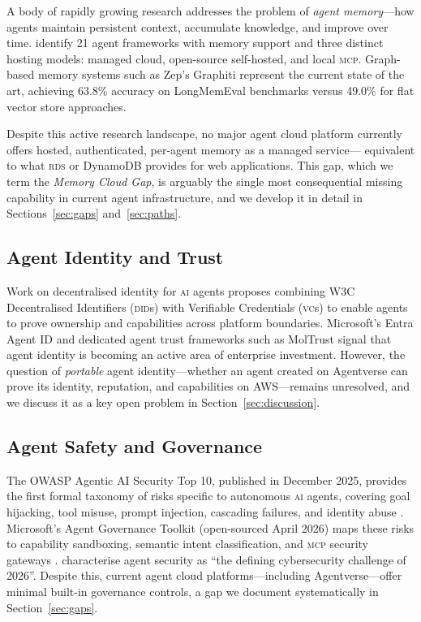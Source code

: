 \documentclass[twoside,11pt]{article}
\begin{document}
A body of rapidly growing research addresses the problem of \emph{agent
memory}---how agents maintain persistent context, accumulate knowledge, and
improve over time.  \citet{mem0blog2026} identify 21 agent frameworks with
memory support and three distinct hosting models: managed cloud, open-source
self-hosted, and local \textsc{mcp}.  Graph-based memory systems such as
Zep's Graphiti \citep{zepgraphiti2025} represent the current state of the art,
achieving 63.8\% accuracy on LongMemEval benchmarks versus 49.0\% for flat
vector store approaches.

Despite this active research landscape, no major agent cloud platform currently
offers hosted, authenticated, per-agent memory as a managed service---
equivalent to what \textsc{rds} or DynamoDB provides for web applications.
This gap, which we term the \emph{Memory Cloud Gap}, is arguably the single
most consequential missing capability in current agent infrastructure, and we
develop it in detail in Sections~\ref{sec:gaps} and~\ref{sec:paths}.

\subsection{Agent Identity and Trust}
\label{subsec:identity}

Work on decentralised identity for \textsc{ai} agents \citep{garzon2025agentdid}
proposes combining W3C Decentralised Identifiers (\textsc{did}s) with
Verifiable Credentials (\textsc{vc}s) to enable agents to prove ownership and
capabilities across platform boundaries.  Microsoft's Entra Agent ID
\citep{microsoft2025entra} and dedicated agent trust frameworks such as
MolTrust \citep{moltrust2026} signal that agent identity is becoming an active
area of enterprise investment.  However, the question of \emph{portable} agent
identity---whether an agent created on Agentverse can prove its identity,
reputation, and capabilities on AWS---remains unresolved, and we discuss it as
a key open problem in Section~\ref{sec:discussion}.

\subsection{Agent Safety and Governance}
\label{subsec:safety}

The OWASP Agentic AI Security Top 10, published in December 2025, provides the
first formal taxonomy of risks specific to autonomous \textsc{ai} agents,
covering goal hijacking, tool misuse, prompt injection, cascading failures, and
identity abuse \citep{owasp2025agentic}.  Microsoft's Agent Governance Toolkit
(open-sourced April 2026) maps these risks to capability sandboxing, semantic
intent classification, and \textsc{mcp} security gateways
\citep{microsoft2026governance}.  \citet{bvp2026security} characterise agent
security as ``the defining cybersecurity challenge of 2026''.  Despite this,
current agent cloud platforms---including Agentverse---offer minimal built-in
governance controls, a gap we document systematically in
Section~\ref{sec:gaps}.
\end{document}
